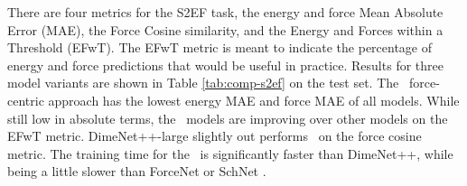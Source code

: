 There are four metrics for the S2EF task, the energy and force Mean Absolute Error (MAE), the Force Cosine similarity, and the Energy and Forces within a Threshold (EFwT). The EFwT metric is meant to indicate the percentage of energy and force predictions that would be useful in practice. Results for three model variants are shown in Table \ref{tab:comp-s2ef} on the test set. The \model~force-centric approach has the lowest energy MAE and force MAE of all models.  While still low in absolute terms, the \model~models are improving over other models on the EFwT metric. DimeNet++-large slightly out performs \model~on the force cosine metric. The training time for the \model~is significantly faster than DimeNet++, while being a little slower than ForceNet \cite{hu2021forcenet} or SchNet \cite{schutt2018schnet}.


\begin{table*}[t]
    \centering
    \renewcommand{\arraystretch}{1.0}
    \setlength{\tabcolsep}{5pt}
\end{table*}
